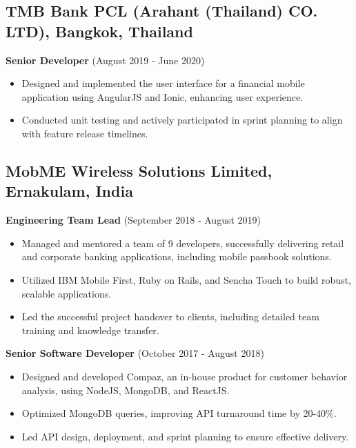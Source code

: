 \documentclass[10pt, letterpaper]{article}
\newenvironment{highlights}{
    \begin{itemize}[
        topsep=0.10cm,
        parsep=0.10cm,
        partopsep=0pt,
        itemsep=0pt,
        leftmargin=0.4cm + 10pt
    ]
}{
    \end{itemize}
}
\begin{document}
\subsection*{TMB Bank PCL (Arahant (Thailand) CO. LTD), Bangkok, Thailand}

\noindent \textbf{Senior Developer} (August 2019 - June 2020)
\begin{highlights}
    \item Designed and implemented the user interface for a financial mobile application using AngularJS and Ionic, enhancing user experience.
    \item Conducted unit testing and actively participated in sprint planning to align with feature release timelines.
\end{highlights}

\subsection*{MobME Wireless Solutions Limited, Ernakulam, India}

\noindent \textbf{Engineering Team Lead} (September 2018 - August 2019)
\begin{highlights}
    \item Managed and mentored a team of 9 developers, successfully delivering retail and corporate banking applications, including mobile passbook solutions.
    \item Utilized IBM Mobile First, Ruby on Rails, and Sencha Touch to build robust, scalable applications.
    \item Led the successful project handover to clients, including detailed team training and knowledge transfer.
\end{highlights}

\noindent \textbf{Senior Software Developer} (October 2017 - August 2018)
\begin{highlights}
    \item Designed and developed Compaz, an in-house product for customer behavior analysis, using NodeJS, MongoDB, and ReactJS.
    \item Optimized MongoDB queries, improving API turnaround time by 20-40\%.
    \item Led API design, deployment, and sprint planning to ensure effective delivery.
\end{highlights}
\end{document}
